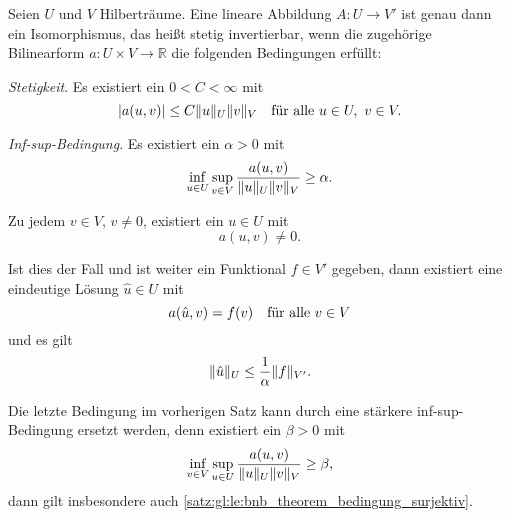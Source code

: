 \begin{Satz}
\label{satz:gl:le:bnb_theorem}
    Seien $U$ und $V$ Hilberträume.
    Eine lineare Abbildung $A \colon U \to V'$ ist genau dann ein Isomorphismus, das heißt stetig invertierbar, wenn die zugehörige Bilinearform $a \colon U \times V \to \mathbb{R}$ die folgenden Bedingungen erfüllt:
    \begin{thmenumerate}
        \item \label{satz:gl:le:bnb_theorem_bedingung_stetig}
        \emph{Stetigkeit}.
        Es existiert ein $0 < C < \infty$ mit
        \begin{equation}
            \abs{a(u, v)} \leq C \norm{u}_{U} \norm{v}_{V} \quad \fa u \in U,~v\in V.
        \end{equation}
        \item \label{satz:gl:le:bnb_theorem_bedingung_inf_sup}
        \emph{Inf-sup-Bedingung}.
        Es existiert ein $\alpha > 0$ mit
        \begin{equation}
            \inf_{u \in U} \sup_{v \in V} \frac{a(u, v)}{\norm{u}_{U} \norm{v}_{V}} \geq \alpha.
        \end{equation}
        \item \label{satz:gl:le:bnb_theorem_bedingung_surjektiv}
        Zu jedem $v \in V$, $v \neq 0$, existiert ein $u \in U$ mit
        \begin{equation}
            a(u, v) \neq 0.
        \end{equation}
    \end{thmenumerate}
    Ist dies der Fall und ist weiter ein Funktional $f \in V'$ gegeben, dann existiert eine eindeutige Lösung $\hat u \in U$ mit
    \begin{equation}
        a(\hat u, v) = f(v) \quad \fa v \in V
    \end{equation}
    und es gilt
    \begin{equation}
        \norm{\hat u}_{U} \leq \frac{1}{\alpha} \norm{f}_{V'}.
    \end{equation}
\end{Satz}

\begin{Bemerkung}
\label{bem:gl:le:bnb_staerkere_voraussetzungen}
    Die letzte Bedingung im vorherigen Satz kann durch eine stärkere inf-sup-Bedingung ersetzt werden, denn existiert ein $\beta > 0$ mit
    \begin{equation}
        \inf_{v \in V} \sup_{u \in U} \frac{a(u, v)}{\norm{u}_{U} \norm{v}_{V}} \geq \beta,
    \end{equation}
    dann gilt insbesondere auch \ref{satz:gl:le:bnb_theorem_bedingung_surjektiv}.
\end{Bemerkung}

